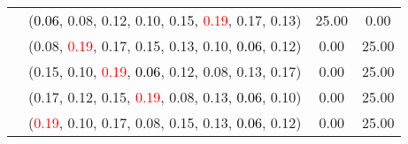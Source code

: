 \documentclass[10pt,a4paper]{report}
\begin{document}
\begin{center}
\begin{longtable}{clcc}
			&(\textcolor{black}{0.06}, 0.08, 0.12, 0.10, 0.15, \textcolor{red}{0.19}, 0.17, 0.13)&25.00&0.00\\
			&(0.08, \textcolor{red}{0.19}, 0.17, 0.15, 0.13, 0.10, \textcolor{black}{0.06}, 0.12)&0.00&25.00\\
			&(0.15, 0.10, \textcolor{red}{0.19}, \textcolor{black}{0.06}, 0.12, 0.08, 0.13, 0.17)&0.00&25.00\\
			&(0.17, 0.12, 0.15, \textcolor{red}{0.19}, 0.08, 0.13, \textcolor{black}{0.06}, 0.10)&0.00&25.00\\
			&(\textcolor{red}{0.19}, 0.10, 0.17, 0.08, 0.15, 0.13, \textcolor{black}{0.06}, 0.12)&0.00&25.00\\
		\bottomrule
	\end{longtable}
\end{center}
\newpage
\end{document}
